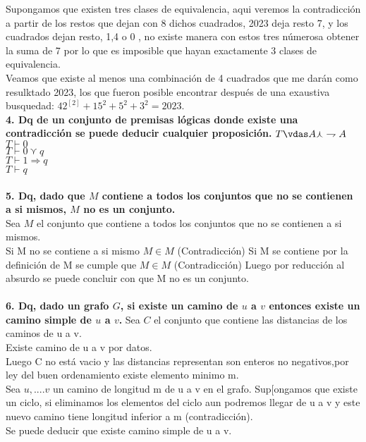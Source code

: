 \documentclass[12pt,a4paper]{article}
\begin{document}
Supongamos que existen tres clases de equivalencia, aqui veremos la contradicci\'on a partir de los restos que dejan con 8 dichos cuadrados, 2023 deja resto 7, y los cuadrados dejan resto, 1,4 o 0 , no existe manera con estos  tres n\'umerosa obtener la suma de 7 por lo que es imposible que hayan exactamente 3 clases de equivalencia.\\
Veamos que existe al menos una combinaci\'on de 4 cuadrados que me dar\'an como resulktado 2023, los que fueron posible encontrar despu\'es de una exaustiva busquedad: $42^[2]+15^{2}+5^{2}+3^{2}=2023 $.
\\
\textbf{4. Dq de un conjunto de premisas l\'ogicas donde existe una contradicci\'on se puede deducir cualquier proposici\'on.}
$T\vdas A  \curlywedge   \rightharpoondown A$\\
$T\vdash 0$\\
$T\vdash 0 \curlyvee q$\\
$T\vdash1\Rightarrow q$\\
$T\vdash q$\\  



\\\textbf{5. Dq, dado que $M$ contiene a todos los conjuntos que no se contienen a si mismos, $M$ no es un conjunto.}\\
 Sea $M$ el conjunto que contiene a todos los conjuntos que no se contienen a si mismos.\\
 Si M no se contiene a si mismo \Rightarrow $M \in M$ (Contradicci\'on)
 Si M se contiene \Rightarrow por la definici\'on de M se cumple que $M \in M$ (Contradicci\'on)
 Luego por reducci\'on al absurdo se puede concluir con que M no es un conjunto.\\
 

\\\textbf{6. Dq, dado un grafo $G$, si existe un camino de $u$ a $v$ entonces existe un camino simple de $u$ a $v$.}
Sea $C$ el conjunto que contiene las distancias de los caminos de u a v.\\
Existe camino de u a v por datos.\\
Luego C no est\'a vacio y las distancias representan son enteros no negativos,por ley del buen ordenamiento existe elemento minimo m.\\
Sea $u,....v$ un camino de longitud m de u a v en el grafo. Sup[ongamos que existe un ciclo, si eliminamos los elementos del ciclo aun podremos llegar de u a v y este nuevo camino tiene longitud inferior a m (contradicci\'on). \\ Se puede deducir que existe camino simple de u a v.
 
\end{document}
